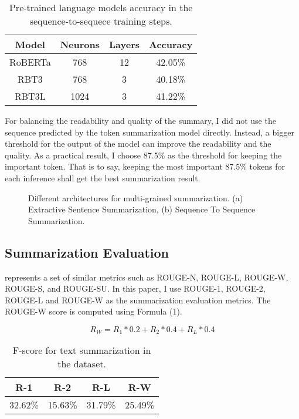 \documentclass[11pt,a4paper]{article}
\begin{document}
\begin{table}
\centering
\begin{tabular}{cccc}
\hline
\textbf{Model} & \textbf{Neurons}& \textbf{Layers} & \textbf{Accuracy} \\
\hline
RoBERTa & 768 & 12 & 42.05\% \\
RBT3 & 768 & 3 & 40.18\% \\
RBT3L & 1024 & 3 & 41.22\% \\
\hline
\end{tabular}
\caption{Pre-trained language models accuracy in the sequence-to-sequece training steps.}
\end{table}


For balancing the readability and quality of the summary, I did not use the sequence predicted by the token summarization model directly.
Instead, a bigger threshold for the output of the model can improve the readability and the quality.
As a practical result, I choose 87.5\% as the threshold for keeping the important token.
That is to say, keeping the most important 87.5\% tokens for each inference shall get the best summarization result.

\begin{figure*}
\begin{center}
\end{center}
   \caption{Different architectures for multi-grained summarization.
   (a) Extractive Sentence Summarization,
   (b) Sequence To Sequence Summarization.}
\label{fig:short}
\end{figure*}

\subsection{Summarization Evaluation}

\citet{lin2004rouge} represents a set of similar metrics such as ROUGE-N, ROUGE-L, ROUGE-W, ROUGE-S, and ROUGE-SU.
In this paper, I use ROUGE-1, ROUGE-2, ROUGE-L and ROUGE-W as the summarization evaluation metrics.
The ROUGE-W score is computed using Formula (1).

\begin{equation}
  {R_W} = {R_1} * 0.2 + {R_2} * 0.4 + {R_L} * 0.4
\end{equation}

\begin{table}
\centering
\begin{tabular}{cccc}
\hline
\textbf{R-1} & \textbf{R-2} & \textbf{R-L} & \textbf{R-W} \\
\hline
32.62\% & 15.63\% & 31.79\% & 25.49\% \\
\hline
\end{tabular}
\caption{F-score for text summarization in the dataset.}
\end{table}
\end{document}
